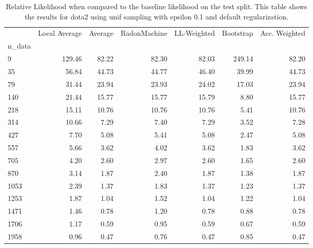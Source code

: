 \begin{table}
\centering
\caption{Relative Likelihood when compared to the baseline likelihood on the test split. This table shows the results for  dota2 using  unif sampling with epsilon  0.1 and  default regularization.}
\label{tab:4}
\begin{tabular}{lrrrrrr}
\toprule
{} &  Local Average &  Average &  RadonMachine &  LL-Weighted &  Bootstrap &  Acc. Weighted \\
n\_data &                &          &               &              &            &                \\
\midrule
9      &         129.46 &    82.22 &         82.30 &        82.03 &     249.14 &          82.20 \\
35     &          56.84 &    44.73 &         44.77 &        46.40 &      39.99 &          44.73 \\
79     &          31.44 &    23.94 &         23.93 &        24.02 &      17.03 &          23.94 \\
140    &          21.44 &    15.77 &         15.77 &        15.79 &       8.80 &          15.77 \\
218    &          15.11 &    10.76 &         10.76 &        10.76 &       5.41 &          10.76 \\
314    &          10.66 &     7.29 &          7.40 &         7.29 &       3.52 &           7.28 \\
427    &           7.70 &     5.08 &          5.41 &         5.08 &       2.47 &           5.08 \\
557    &           5.66 &     3.62 &          4.02 &         3.62 &       1.83 &           3.62 \\
705    &           4.20 &     2.60 &          2.97 &         2.60 &       1.65 &           2.60 \\
870    &           3.14 &     1.87 &          2.40 &         1.87 &       1.38 &           1.87 \\
1053   &           2.39 &     1.37 &          1.83 &         1.37 &       1.23 &           1.37 \\
1253   &           1.87 &     1.04 &          1.52 &         1.04 &       1.22 &           1.04 \\
1471   &           1.46 &     0.78 &          1.20 &         0.78 &       0.88 &           0.78 \\
1706   &           1.17 &     0.59 &          0.95 &         0.59 &       0.67 &           0.59 \\
1958   &           0.96 &     0.47 &          0.76 &         0.47 &       0.85 &           0.47 \\
\bottomrule
\end{tabular}
\end{table}
